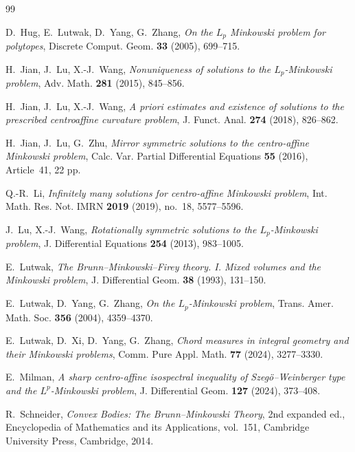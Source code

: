 \documentclass[12pt,reqno]{amsart}
\numberwithin{equation}{section}
\theoremstyle{remark}
\begin{document}
\begin{thebibliography}{99}
	
	D.~Hug, E.~Lutwak, D.~Yang,  G.~Zhang,
	\emph{On the $L_p$ Minkowski problem for polytopes},
	Discrete Comput. Geom. \textbf{33} (2005), 699--715.
	
	H.~Jian, J.~Lu,  X.-J.~Wang,
	\emph{Nonuniqueness of solutions to the $L_p$-Minkowski problem},
	Adv. Math. \textbf{281} (2015), 845--856.
	
	H.~Jian, J.~Lu,  X.-J.~Wang,
	\emph{A priori estimates and existence of solutions to the prescribed centroaffine curvature problem},
	J. Funct. Anal. \textbf{274} (2018), 826--862.
	
	H.~Jian, J.~Lu,  G.~Zhu,
	\emph{Mirror symmetric solutions to the centro-affine Minkowski problem},
	Calc. Var. Partial Differential Equations \textbf{55} (2016), Article~41, 22 pp.
	
	Q.-R.~Li,
	\emph{Infinitely many solutions for centro-affine Minkowski problem},
	Int. Math. Res. Not. IMRN \textbf{2019} (2019),
	no.~18, 5577--5596.
	
	
	J.~Lu,  X.-J.~Wang,
	\emph{Rotationally symmetric solutions to the $L_p$-Minkowski problem},
	J. Differential Equations \textbf{254} (2013), 983--1005.
	
	E.~Lutwak,
	\emph{The Brunn--Minkowski--Firey theory. I. Mixed volumes and the Minkowski problem},
	J. Differential Geom. \textbf{38} (1993), 131--150.
	
	E.~Lutwak, D.~Yang,  G.~Zhang,
	\emph{On the $L_p$-Minkowski problem},
	Trans. Amer. Math. Soc. \textbf{356} (2004), 4359--4370.
	
	E.~Lutwak, D.~Xi, D.~Yang,  G.~Zhang,
	\emph{Chord measures in integral geometry and their Minkowski problems},
	Comm. Pure Appl. Math. \textbf{77} (2024), 3277--3330.
	
	E.~Milman,
	\emph{A sharp centro-affine isospectral inequality of
		Szeg\"o--Weinberger type and the $L^p$-Minkowski problem},
	J. Differential Geom. \textbf{127} (2024), 373--408.
	
	R.~Schneider,
	\emph{Convex Bodies: The Brunn--Minkowski Theory},
	2nd expanded ed., Encyclopedia of Mathematics and its Applications, vol.~151,
	Cambridge University Press, Cambridge, 2014.
	


\end{thebibliography}
\end{document}
